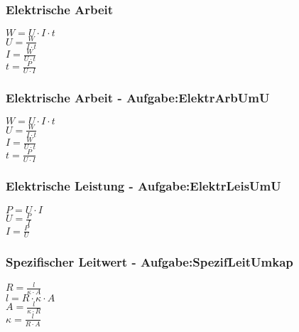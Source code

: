 \subsubsection{Elektrische Arbeit} 
\begin{minipage}{0.45\textwidth} 
$ W = U\cdot I\cdot t $\\ 
$ U = \frac{W}{I\cdot t} $\\ 
$ I = \frac{W}{U\cdot t} $\\ 
$ t = \frac{ P}{U\cdot I} $\\ 
\end{minipage} 
\begin{minipage}{0.45\textwidth} 
 
\end{minipage} 
\subsubsection{Elektrische Arbeit - Aufgabe:ElektrArbUmU} 
\begin{minipage}{0.45\textwidth} 
$ W = U\cdot I\cdot t $\\ 
$ U = \frac{W}{I\cdot t} $\\ 
$ I = \frac{W}{U\cdot t} $\\ 
$ t = \frac{ P}{U\cdot I} $\\ 
\end{minipage} 
\begin{minipage}{0.45\textwidth} 
 
\end{minipage} 
\subsubsection{Elektrische Leistung - Aufgabe:ElektrLeisUmU} 
\begin{minipage}{0.45\textwidth} 
$ P = U\cdot I $\\ 
$ U = \frac{P}{I} $\\ 
$ I = \frac{P}{U} $\\ 
\end{minipage} 
\begin{minipage}{0.45\textwidth} 
 
\end{minipage} 
\subsubsection{Spezifischer Leitwert - Aufgabe:SpezifLeitUmkap} 
\begin{minipage}{0.45\textwidth} 
$ R = \frac{ l}{\kappa \cdot A} $\\ 
$ l = R\cdot \kappa \cdot A $\\ 
$ A = \frac{l}{\kappa \cdot R} $\\ 
$ \kappa  = \frac{ l}{R\cdot A} $\\ 
\end{minipage} 
\begin{minipage}{0.45\textwidth} 
 
\end{minipage} 
